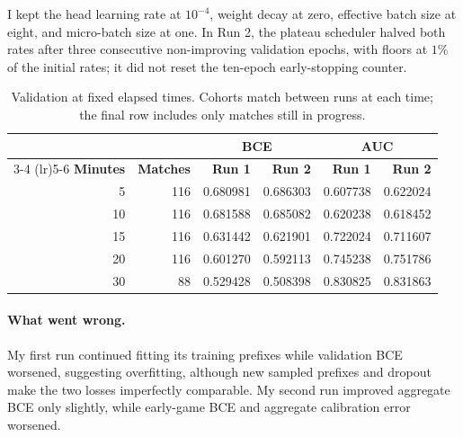 \documentclass[11pt]{article}
\begin{document}
    I kept the head learning rate at $10^{-4}$, weight decay at zero, effective
    batch size at eight, and micro-batch size at one. In Run 2, the plateau
    scheduler halved both rates after three consecutive non-improving validation
    epochs, with floors at $1\%$ of the initial rates; it did not reset the
    ten-epoch early-stopping counter.

    \begin{table}[H]
    \centering
    \small
    \renewcommand{\arraystretch}{1.15}
    \begin{tabular}{rrrrrr}
    \toprule
    & & \multicolumn{2}{c}{\textbf{BCE}} & \multicolumn{2}{c}{\textbf{AUC}} \\
    \cmidrule(lr){3-4} \cmidrule(lr){5-6}
    \textbf{Minutes} & \textbf{Matches} & \textbf{Run 1} & \textbf{Run 2} & \textbf{Run 1} & \textbf{Run 2} \\
    \midrule
     5 & 116 & 0.680981 & 0.686303 & 0.607738 & 0.622024 \\
    10 & 116 & 0.681588 & 0.685082 & 0.620238 & 0.618452 \\
    15 & 116 & 0.631442 & 0.621901 & 0.722024 & 0.711607 \\
    20 & 116 & 0.601270 & 0.592113 & 0.745238 & 0.751786 \\
    30 &  88 & 0.529428 & 0.508398 & 0.830825 & 0.831863 \\
    \bottomrule
    \end{tabular}
    \caption{Validation at fixed elapsed times. Cohorts match between runs at
    each time; the final row includes only matches still in progress.}
    \label{tab:finetune-time-results}
    \end{table}

    \paragraph{What went wrong.}
    My first run continued fitting its training prefixes while validation BCE
    worsened, suggesting overfitting, although new sampled prefixes and dropout
    make the two losses imperfectly comparable. My second run improved aggregate
    BCE only slightly, while early-game BCE and aggregate calibration error worsened.
\end{document}
